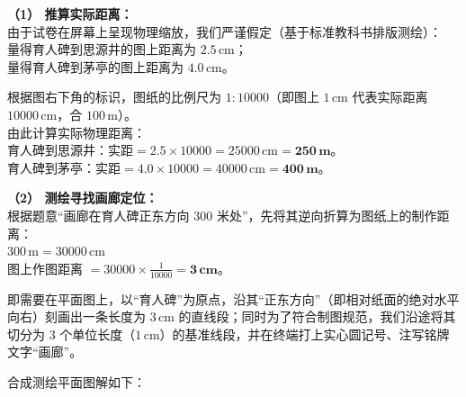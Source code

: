 \textbf{（1） 推算实际距离：} \\
由于试卷在屏幕上呈现物理缩放，我们严谨假定（基于标准教科书排版测绘）：\\
量得育人碑到思源井的图上距离为 \textbf{$2.5\,\text{cm}$}；\\
量得育人碑到茅亭的图上距离为 \textbf{$4.0\,\text{cm}$}。

根据图右下角的标识，图纸的比例尺为 $1:10000$（即图上 $1\,\text{cm}$ 代表实际距离 $10000\,\text{cm}$，合 $100\,\text{m}$）。\\
由此计算实际物理距离：\\
育人碑到思源井：$\text{实距} = 2.5 \times 10000 = 25000\,\text{cm} = \boldsymbol{250\,\text{m}}$。\\
育人碑到茅亭：$\text{实距} = 4.0 \times 10000 = 40000\,\text{cm} = \boldsymbol{400\,\text{m}}$。

\vspace{0.4cm}

\textbf{（2） 测绘寻找画廊定位：} \\
根据题意“画廊在育人碑正东方向 $300$ 米处”，先将其逆向折算为图纸上的制作距离：\\
$300\,\text{m} = 30000\,\text{cm}$ \\
图上作图距离 $= 30000 \times \frac{1}{10000} = \boldsymbol{3\,\text{cm}}$。

即需要在平面图上，以“育人碑”为原点，沿其“正东方向”（即相对纸面的绝对水平向右）刻画出一条长度为 $3\,\text{cm}$ 的直线段；同时为了符合制图规范，我们沿途将其切分为 $3$ 个单位长度（$1\,\text{cm}$）的基准线段，并在终端打上实心圆记号、注写铭牌文字“画廊”。

\vspace{0.4cm}

合成测绘平面图解如下：

